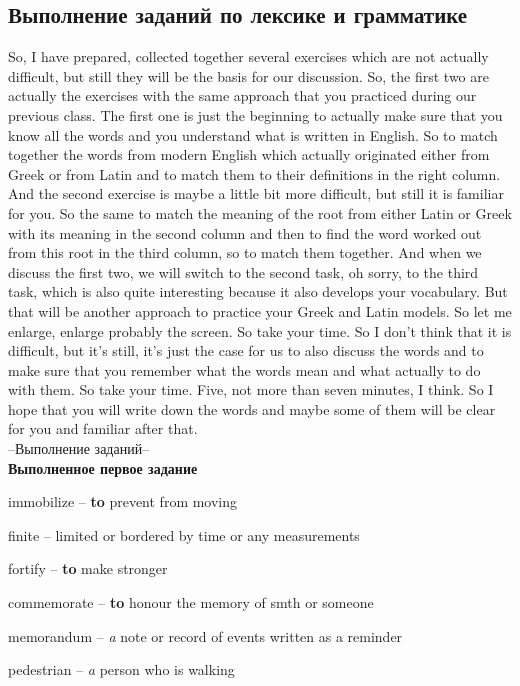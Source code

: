 \documentclass[main.tex]{subfiles}
\begin{document}
\subsection{Выполнение заданий по лексике и грамматике}

So, I have prepared, collected together several exercises which are not actually difficult, but still they will be the basis for our discussion.
So, the first two are actually the exercises with the same approach that you practiced during our previous class.
The first one is just the beginning to actually make sure that you know all the words and you understand what is written in English.
So to match together the words from modern English which actually originated either from Greek or from Latin and to match them to their definitions in the right column.
And the second exercise is maybe a little bit more difficult, but still it is familiar for you.
So the same to match the meaning of the root from either Latin or Greek with its meaning in the second column and then to find the word worked out from this root in the third column, so to match them together.
And when we discuss the first two, we will switch to the second task, oh sorry, to the third task, which is also quite interesting because it also develops your vocabulary.
But that will be another approach to practice your Greek and Latin models.
So let me enlarge, enlarge probably the screen.
So take your time.
So I don't think that it is difficult, but it's still, it's just the case for us to also discuss the words and to make sure that you remember what the words mean and what actually to do with them.
So take your time.
Five, not more than seven minutes, I think.
So I hope that you will write down the words and maybe some of them will be clear for you and familiar after that.
\\

--Выполнение заданий--
\\

\textbf{Выполненное первое задание}

immobilize -- \textbf{to} prevent from moving

finite -- limited or bordered by time or any measurements

fortify -- \textbf{to} make stronger

commemorate -- \textbf{to} honour the memory of smth or someone

memorandum -- \textit{a} note or record of events written as a reminder

pedestrian -- \textit{a} person who is walking
\end{document}

